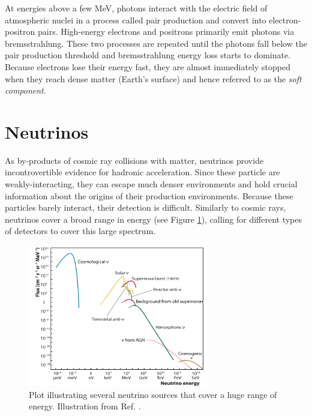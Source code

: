At energies above a few MeV, photons interact with the electric field of atmospheric nuclei in a process called pair production and convert into electron-positron pairs. High-energy electrons and positrons primarily emit photons via bremsstrahlung. These two processes are repeated until the photons fall below the pair production threshold and bremsstrahlung energy loss starts to dominate. Because electrons lose their energy fast, they are almost immediately stopped when they reach dense matter (Earth's surface) and hence referred to as the \textit{soft component}.


\section{Neutrinos}
\label{sec:neutrinos}
As by-products of cosmic ray collisions with matter, neutrinos provide incontrovertible evidence for hadronic acceleration. Since these particle are weakly-interacting, they can escape much denser environments and hold crucial information about the origins of their production environments. Because these particles barely interact, their detection is difficult. Similarly to cosmic rays, neutrinos cover a broad range in energy (see Figure \ref{fig:neutrinospectrumall}), calling for different types of detectors to cover this large spectrum. 

\begin{figure}[t]
\centering
\includegraphics[width=0.7\textwidth]{chapter3/img/neutrinospectrum.png}
\caption{Plot illustrating several neutrino sources that cover a huge range of energy. Illustration from Ref. \cite{Katz:2011ke}.}
\label{fig:neutrinospectrumall}
\end{figure}

